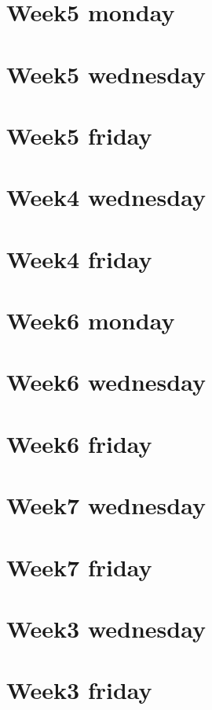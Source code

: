 
\section*{Week5 monday}

\vfill
\section*{Week5 wednesday}

\vfill
\section*{Week5 friday}

\vfill
\section*{Week4 wednesday}

\vfill
\section*{Week4 friday}

\vfill
\section*{Week6 monday}

\vfill
\section*{Week6 wednesday}

\vfill
\section*{Week6 friday}

\vfill
\section*{Week7 wednesday}

\vfill
\section*{Week7 friday}

\vfill
\section*{Week3 wednesday}

\vfill
\section*{Week3 friday}

\vfill
